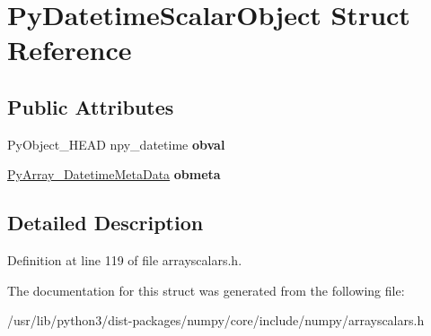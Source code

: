 \hypertarget{structPyDatetimeScalarObject}{}\section{Py\+Datetime\+Scalar\+Object Struct Reference}
\label{structPyDatetimeScalarObject}
\subsection*{Public Attributes}
\begin{DoxyCompactItemize}
\item 
Py\+Object\+\_\+\+H\+E\+AD npy\+\_\+datetime {\bfseries obval}\hypertarget{structPyDatetimeScalarObject_ab6f01dd90796ef8b7261ed646f7831cf}{}\label{structPyDatetimeScalarObject_ab6f01dd90796ef8b7261ed646f7831cf}

\item 
\hyperlink{structPyArray__DatetimeMetaData}{Py\+Array\+\_\+\+Datetime\+Meta\+Data} {\bfseries obmeta}\hypertarget{structPyDatetimeScalarObject_a3d73c2416837a6061328c8ecb3e2b4d3}{}\label{structPyDatetimeScalarObject_a3d73c2416837a6061328c8ecb3e2b4d3}

\end{DoxyCompactItemize}


\subsection{Detailed Description}


Definition at line 119 of file arrayscalars.\+h.



The documentation for this struct was generated from the following file\+:\begin{DoxyCompactItemize}
\item 
/usr/lib/python3/dist-\/packages/numpy/core/include/numpy/arrayscalars.\+h\end{DoxyCompactItemize}

